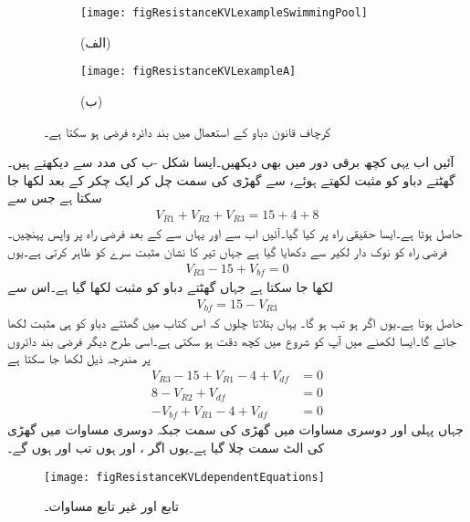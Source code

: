 \begin{figure}
\centering
\begin{subfigure}{0.5\textwidth}
\centering
\texttt{[image: figResistanceKVLexampleSwimmingPool]}
\caption*{(الف)}
\end{subfigure}%
%
\begin{subfigure}{0.5\textwidth}
\centering
\texttt{[image: figResistanceKVLexampleA]}
\caption*{(ب)}
\end{subfigure}%
\caption{کرچاف قانون دباو کے استعمال میں بند دائرہ فرضی ہو سکتا ہے۔}
\label{شکل_مزاحمتی_فرضی_بند_دائرہ}
\end{figure}

آئیں اب یہی کچھ برقی دور میں بھی دیکھیں۔ایسا شکل -ب کی مدد سے دیکھتے ہیں۔گھٹتے دباو کو مثبت لکھتے ہوئے،   سے  گھڑی کی سمت چل کر ایک چکر کے بعد  لکھا جا سکتا ہے جس سے
\begin{align*}
V_{R1}+V_{R2}+V_{R3}=15+4+8
\end{align*}
حاصل ہوتا ہے۔ایسا حقیقی راہ پر کیا گیا۔آئیں اب  سے  اور یہاں سے  کے بعد فرضی راہ پر واپس  پہنچیں۔فرضی راہ کو نوک دار لکیر سے دکھایا گیا ہے جہاں تیر کا نشان مثبت سرے کو ظاہر کرتی ہے۔یوں
\begin{align*}
V_{R3}-15+V_{bf}=0
\end{align*}
لکھا جا سکتا ہے جہاں گھٹتے دباو کو مثبت لکھا گیا ہے۔اس سے 
\begin{align*}
V_{bf}=15-V_{R3}
\end{align*}
حاصل ہوتا ہے۔یوں اگر  ہو تب  ہو گا۔ یہاں بتلاتا چلوں کہ اس کتاب میں گھٹتے دباو کو ہی مثبت لکھا جائے گا۔ایسا لکھنے میں آپ کو شروع میں کچھ دقت ہو سکتی ہے۔اسی طرح دیگر فرضی بند دائروں پر مندرجہ ذیل لکھا جا سکتا ہے
\begin{align*}
V_{R3}-15+V_{R1}-4+V_{df}&=0\\
8-V_{R2}+V_{df}&=0\\
-V_{bf}+V_{R1}-4+V_{df}&=0
\end{align*} 
جہاں پہلی اور دوسری مساوات میں گھڑی کی سمت جبکہ دوسری مساوات میں گھڑی کی الٹ سمت چلا گیا ہے۔یوں اگر ،  اور  ہوں تب  اور  ہوں گے۔

\begin{figure}
\centering
\texttt{[image: figResistanceKVLdependentEquations]}
\caption{تابع اور غیر تابع مساوات۔}
\label{شکل_مزاحمتی_تابع_مساوات}
\end{figure}

